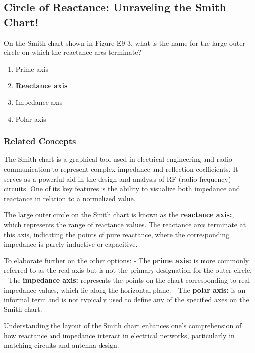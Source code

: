 \subsection{Circle of Reactance: Unraveling the Smith Chart!}

\begin{tcolorbox}[colback=gray!10, colframe=black, title=E9G06] On the Smith chart shown in Figure E9-3, what is the name for the large outer circle on which the reactance arcs terminate?
\begin{enumerate}[label=\Alph*.]
    \item Prime axis
    \item \textbf{Reactance axis}
    \item Impedance axis
    \item Polar axis
\end{enumerate} \end{tcolorbox}

\subsubsection{Related Concepts}

The Smith chart is a graphical tool used in electrical engineering and radio communication to represent complex impedance and reflection coefficients. It serves as a powerful aid in the design and analysis of RF (radio frequency) circuits. One of its key features is the ability to visualize both impedance and reactance in relation to a normalized value.

The large outer circle on the Smith chart is known as the \textbf{reactance axis:}, which represents the range of reactance values. The reactance arcs terminate at this axis, indicating the points of pure reactance, where the corresponding impedance is purely inductive or capacitive. 

To elaborate further on the other options:
- The \textbf{prime axis:} is more commonly referred to as the real-axis but is not the primary designation for the outer circle.
- The \textbf{impedance axis:} represents the points on the chart corresponding to real impedance values, which lie along the horizontal plane.
- The \textbf{polar axis:} is an informal term and is not typically used to define any of the specified axes on the Smith chart.

Understanding the layout of the Smith chart enhances one's comprehension of how reactance and impedance interact in electrical networks, particularly in matching circuits and antenna design.

